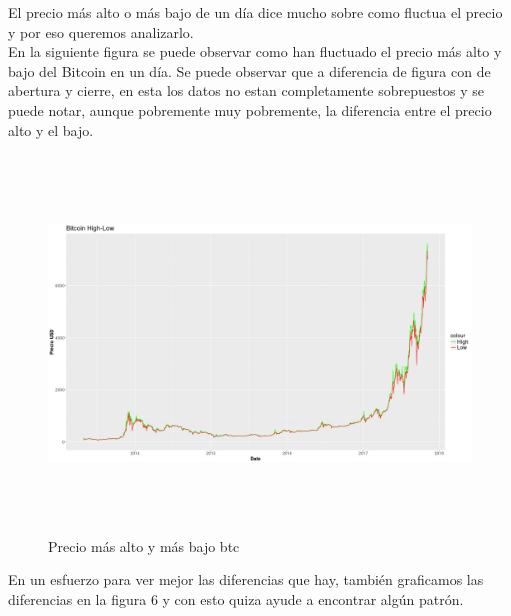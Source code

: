 \documentclass[12pt,letterpaper]{article}
\begin{document}
    El precio m\'as alto o m\'as bajo de un d\'ia dice mucho sobre como fluctua el precio y por eso queremos analizarlo.
    \\

    En la siguiente figura se puede observar como han fluctuado el precio m\'as alto y bajo del Bitcoin en un d\'ia. Se puede observar que a diferencia de figura con de abertura y cierre, en esta los datos no estan completamente sobrepuestos y se puede notar, aunque pobremente muy pobremente, la diferencia entre el precio alto y el bajo.
    \\

    \begin{figure}
        \centering

        \includegraphics[width = 18cm, height = 10cm]{btc/date_vs_high-low}

        \caption{Precio m\'as alto y m\'as bajo btc}
    \end{figure}

    En un esfuerzo para ver mejor las diferencias que hay, tambi\'en graficamos las diferencias en la figura 6 y con esto quiza ayude a encontrar alg\'un patr\'on.
\end{document}
